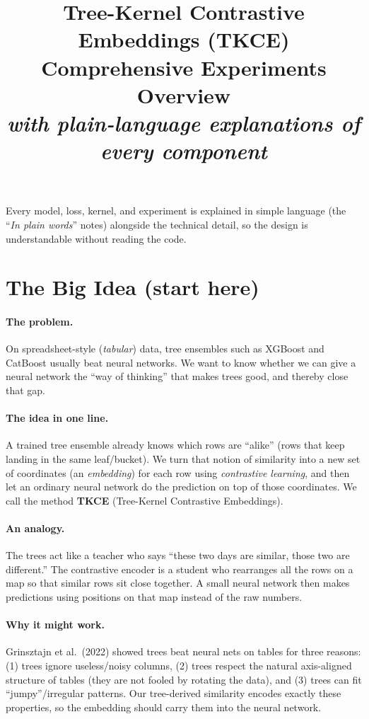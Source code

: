 \documentclass[11pt]{article}
\title{\textbf{Tree-Kernel Contrastive Embeddings (TKCE)}\\[2pt]
\large Comprehensive Experiments Overview\\[2pt]
\normalsize\itshape with plain-language explanations of every component}
\author{}
\date{}
\begin{document}
\maketitle
\vspace{-2.5em}
\begin{center}\small Every model, loss, kernel, and experiment is explained in
simple language (the ``\emph{In plain words}'' notes) alongside the technical
detail, so the design is understandable without reading the code.\end{center}
\tableofcontents
\bigskip

\section{The Big Idea (start here)}
\paragraph{The problem.} On spreadsheet-style (\emph{tabular}) data, tree
ensembles such as XGBoost and CatBoost usually beat neural networks. We want to
know whether we can give a neural network the ``way of thinking'' that makes
trees good, and thereby close that gap.

\paragraph{The idea in one line.} A trained tree ensemble already knows which
rows are ``alike'' (rows that keep landing in the same leaf/bucket). We turn that
notion of similarity into a new set of coordinates (an \emph{embedding}) for each
row using \emph{contrastive learning}, and then let an ordinary neural network do
the prediction on top of those coordinates. We call the method \textbf{TKCE}
(Tree-Kernel Contrastive Embeddings).

\paragraph{An analogy.} The trees act like a teacher who says ``these two days
are similar, those two are different.'' The contrastive encoder is a student who
rearranges all the rows on a map so that similar rows sit close together. A small
neural network then makes predictions using positions on that map instead of the
raw numbers.

\paragraph{Why it might work.} Grinsztajn et al.\ (2022) showed trees beat neural
nets on tables for three reasons: (1) trees ignore useless/noisy columns, (2)
trees respect the natural axis-aligned structure of tables (they are not fooled
by rotating the data), and (3) trees can fit ``jumpy''/irregular patterns. Our
tree-derived similarity encodes exactly these properties, so the embedding should
carry them into the neural network.
\end{document}
